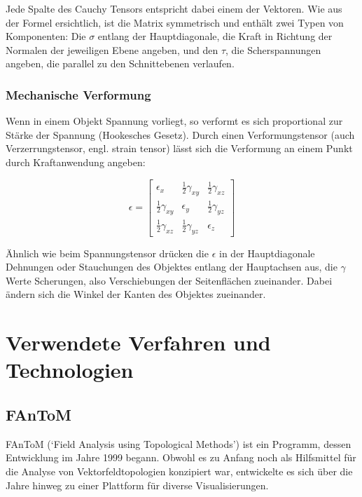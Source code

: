 \documentclass[a4paper,fontsize=12pt,toc=bib,halfparskip,ngerman]{scrartcl}
\begin{document}
Jede Spalte des Cauchy Tensors entspricht dabei einem der Vektoren. Wie aus der Formel ersichtlich, ist die Matrix symmetrisch und enth\"alt zwei Typen von Komponenten: Die $\sigma$ entlang der Hauptdiagonale, die Kraft in Richtung der Normalen der jeweiligen Ebene angeben, und den $\tau$, die Scherspannungen angeben, die parallel zu den Schnittebenen verlaufen. 

\subsubsection{Mechanische Verformung}
Wenn in einem Objekt Spannung vorliegt, so verformt es sich proportional zur St\"arke der Spannung (Hookesches Gesetz). Durch einen Verformungstensor (auch Verzerrungstensor, engl. strain tensor) l\"asst sich die Verformung an einem Punkt durch Kraftanwendung angeben:

\begin{equation}
	\epsilon  =  
	\begin{bmatrix}
		\epsilon_x & \frac{1}{2}\gamma_{xy} & \frac{1}{2}\gamma_{xz}\\
		\frac{1}{2}\gamma_{xy} & \epsilon_y & \frac{1}{2}\gamma_{yz}\\
		\frac{1}{2}\gamma_{xz} & \frac{1}{2}\gamma_{yz} & \epsilon_z
	\end{bmatrix}
\end{equation}

\"Ahnlich wie beim Spannungstensor dr\"ucken die $\epsilon$ in der Hauptdiagonale Dehnungen oder Stauchungen des Objektes entlang der Hauptachsen aus, die $\gamma$ Werte Scherungen, also Verschiebungen der Seitenfl\"achen zueinander. Dabei \"andern sich die Winkel der Kanten des Objektes zueinander.

\section{Verwendete Verfahren und Technologien}
\label{sec:Technologien}
\subsection{FAnToM}
FAnToM\cite{fantomWebsite}\cite{wiebel2009fantom} (`Field Analysis using Topological Methods') ist ein Programm, dessen Entwicklung im Jahre 1999 begann. Obwohl es zu Anfang noch als Hilfsmittel f\"ur die Analyse von Vektorfeldtopologien konzipiert war, entwickelte es sich \"uber die Jahre hinweg zu einer Plattform f\"ur diverse Visualisierungen.
\end{document}
